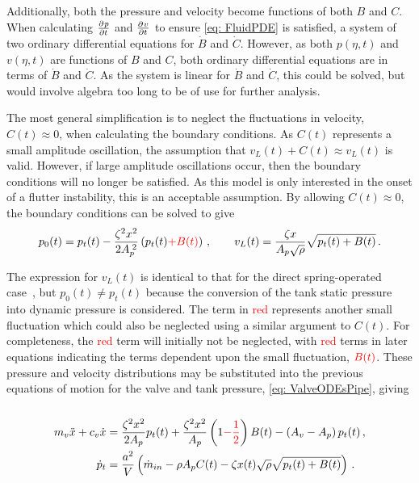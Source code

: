 Additionally, both the pressure and velocity become functions of both $B$ and $C$. When calculating $\pdiff{p}{t}$ and $\pdiff{v}{t}$ to ensure \cref{eq: FluidPDE} is satisfied, a system of two ordinary differential equations for $\dot{B}$ and $\dot{C}$. However, as both $p(\eta,t)$ and $v(\eta,t)$ are functions of $B$ and $C$, both ordinary differential equations are in terms of $\dot{B}$ and $\dot{C}$. As the system is linear for $\dot{B}$ and $\dot{C}$, this could be solved, but would involve algebra too long to be of use for further analysis.

The most general simplification is to neglect the fluctuations in velocity, $C(t) \approx 0$, when calculating the boundary conditions. As $C(t)$ represents a small amplitude oscillation, the assumption that $v_L(t) + C(t) \approx v_L(t)$ is valid. However, if large amplitude oscillations occur, then the boundary conditions will no longer be satisfied. As this model is only interested in the onset of a flutter instability, this is an acceptable assumption. By allowing $C(t) \approx 0$, the boundary conditions can be solved to give
~
\begin{equation} \label{eq: QWMPresAndVelBound}
    p_0(t) = p_t(t) - \frac{\zeta^2 x^2}{2 A_p\power{2}} \left( p_t(t) \textcolor{Red}{+ B(t)} \right)
    \, , \qquad
    v_L(t) = \frac{\zeta x}{A_p \sqrt{\rho}} \sqrt{p_t(t) + B(t)} \, .
\end{equation}

The expression for $v_L(t)$ is identical to that for the direct spring-operated case~\cite{Hos2015ModelPipe}, but $p_0(t) \neq p_t(t)$ because the conversion of the tank static pressure into dynamic pressure is considered. The term in \textcolor{Red}{red} represents another small fluctuation which could also be neglected using a similar argument to $C(t)$. For completeness, the \textcolor{Red}{red} term will initially not be neglected, with \textcolor{Red}{red} terms in later equations indicating the terms dependent upon the small fluctuation, $\textcolor{Red}{B(t)}$. These pressure and velocity distributions may be substituted into the previous equations of motion for the valve and tank pressure, \cref{eq: ValveODEsPipe}, giving
~
\begin{equation*}
\begin{split}
    m_v \ddot{x} + c_v \dot{x} &= \frac{\zeta^2 x^2}{2 A_p} p_t(t) + \frac{\zeta^2 x^2}{A_p} \left( 1 \textcolor{Red}{- \frac{1}{2}} \right) B(t) - \left( A_v - A_p \right) p_t(t)
    \, , \\
    \dot{p}_t &= \frac{a^2}{V} \left( \dot{m}_{in} - \rho A_p C(t) - \zeta x(t) \sqrt{\rho} \sqrt{p_t(t) + B(t)} \right) \, .
\end{split}
\end{equation*}

